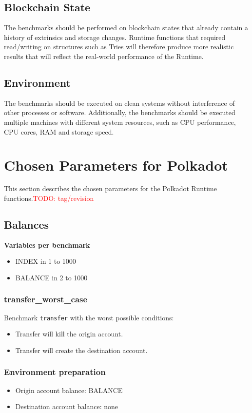 \documentclass[11pt,a4paper]{article}
\newcommand{\todo}[1]{\textcolor{red}{TODO: #1}}
\begin{document}
\subsection{Blockchain State}
The benchmarks should be performed on blockchain states that already contain a history of
extrinsics and storage changes. Runtime functions that required read/writing on structures
such as Tries will therefore produce more realistic results that will reflect the real-world
performance of the Runtime.

\subsection{Environment}
The benchmarks should be executed on clean systems without interference of other processes
or software. Additionally, the benchmarks should be executed multiple machines with different
system resources, such as CPU performance, CPU cores, RAM and storage speed.

\section{Chosen Parameters for Polkadot}
This section describes the chosen parameters for the Polkadot Runtime functions.\todo{tag/revision}

\subsection{Balances}

\textbf{Variables per benchmark}
\begin{itemize}
\item INDEX in 1 to 1000
\item BALANCE in 2 to 1000
\end{itemize}

\subsubsection{transfer\_worst\_case}

Benchmark \verb|transfer| with the worst possible conditions:
\begin{itemize}
\item Transfer will kill the origin account.
\item Transfer will create the destination account.
\end{itemize}

\subsubsection*{Environment preparation}
\begin{itemize}
\item Origin account balance: BALANCE
\item Destination account balance: none
\end{itemize}
\end{document}
